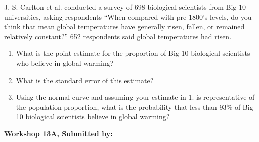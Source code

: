\documentclass[11pt]{book}\usepackage[]{graphicx}\usepackage[]{color}
\begin{document}
\begin{exercises}
\begin{exercise}
\begin{center}
\end{center}

J. S. Carlton et al. conducted a survey of 698 biological scientists from Big 10 universities, asking respondents ``When compared with pre-1800's levels, do you think that mean global temperatures have generally risen, fallen, or remained relatively constant?'' 652 respondents said global temperatures had risen.
 
\begin{enumerate}
  \item What is the point estimate for the proportion of Big 10 biological scientists who believe in global warming?
  \item What is the standard error of this estimate?
  \item Using the normal curve and assuming your estimate in 1. is representative of the population proportion, what is the probability that less than 93\% of Big 10 biological scientists believe in global warming?
\end{enumerate}

\end{exercise} 
\begin{solution}  %

\end{solution}


\clearpage

    \begin{exercise}  %

    \begin{center}
\begin{flushleft}\textbf{\large \hfill Workshop 13A, Submitted by: }\end{flushleft}


\end{center}
\end{exercise}
\end{exercises}
\end{document}
